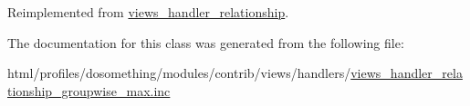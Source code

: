 Reimplemented from \hyperlink{classviews__handler__relationship_a7dc0b6371807dbf06efa594cb52b3348}{views\_\-handler\_\-relationship}.

The documentation for this class was generated from the following file:\begin{DoxyCompactItemize}
\item 
html/profiles/dosomething/modules/contrib/views/handlers/\hyperlink{views__handler__relationship__groupwise__max_8inc}{views\_\-handler\_\-relationship\_\-groupwise\_\-max.inc}\end{DoxyCompactItemize}
